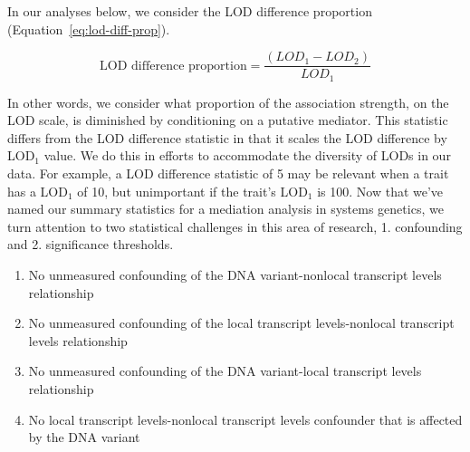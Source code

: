 \documentclass[oneside]{book}\usepackage[]{graphicx}\usepackage[]{color}
\newenvironment{frameenv}[1]
    {\begin{myfloat}[tb]
    \begin{mdframed}[roundcorner=10pt,backgroundcolor=blue!10]
    \caption{#1}
    }
    {%
    \end{mdframed}\end{myfloat}
    }
\begin{document}
In our analyses below, we consider the LOD difference proportion (Equation~\ref{eq:lod-diff-prop}).

\begin{equation}
\text{LOD difference proportion} = \frac{(LOD_1 - LOD_2)}{LOD_1}
\label{eq:lod-diff-prop}
\end{equation}

In other words, we consider what proportion of the association strength, on the LOD scale, is diminished by conditioning on a putative mediator. 
This statistic differs from the LOD difference statistic in that it scales the LOD difference by LOD$_1$ value. 
We do this in efforts to accommodate the diversity of LODs in our data. 
For example, a LOD difference statistic of 5 may be relevant when 
a trait has a LOD$_1$ of 10, but unimportant if the trait's LOD$_1$ is 100. Now that we've named our summary statistics for a mediation analysis in systems genetics, we turn attention to two statistical challenges in this area of research, 1. confounding and 2. significance thresholds.












\begin{frameenv}{Four assumptions for causal inference}\label{frame1}
  \begin{enumerate}
\item No unmeasured confounding of the DNA variant-nonlocal transcript levels relationship
\item No unmeasured confounding of the local transcript levels-nonlocal transcript levels relationship
\item No unmeasured confounding of the DNA variant-local transcript levels relationship
\item No local transcript levels-nonlocal transcript levels confounder that is affected by the DNA variant
\end{enumerate}

\end{frameenv}
\end{document}
